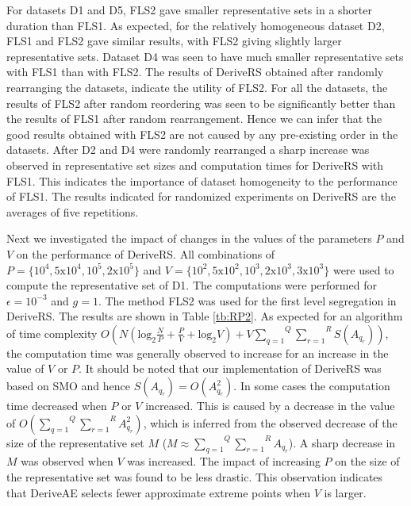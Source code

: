 \documentclass[twoside]{article}
\begin{document}
For datasets D1 and D5, FLS2 gave smaller representative sets in a shorter duration than FLS1. As expected, for the relatively homogeneous dataset D2, FLS1 and FLS2 gave similar results, with FLS2 giving slightly larger representative sets. Dataset D4 was seen to have much smaller representative sets with FLS1 than with FLS2. The results of DeriveRS obtained after randomly rearranging the datasets, indicate the utility of FLS2. For all the datasets, the results of FLS2 after random reordering was seen to be significantly better than the results of FLS1 after random rearrangement. Hence we can infer that the good results obtained with FLS2 are not caused by any pre-existing order in the datasets. After D2 and D4 were randomly rearranged a sharp increase was observed in representative set sizes and computation times for DeriveRS with FLS1. This indicates the importance of dataset homogeneity to the performance of FLS1. The results indicated for randomized experiments on DeriveRS are the averages of five repetitions.

Next we investigated the impact of changes in the values of the parameters $P$ and $V$ on the performance of DeriveRS. All combinations of $P = \{10^4, 5\text{x}10^4,10^5,2\text{x}10^5\}$ and $V = \{10^2,5\text{x}10^2,10^3,2\text{x}10^3,3\text{x}10^3\}$ were used to compute the representative set of D1. The computations were performed for $\epsilon = 10^{-3}$ and $g = 1$. The method FLS2 was used for the first level segregation in DeriveRS. The results are shown in Table \ref{tb:RP2}. As expected for an algorithm of time complexity $O(N (\text{log}_2 \frac{N}{P} + \frac{P}{V} + \text{log}_2 V) + V\overset{Q}{\underset{q = 1}{\sum}} \overset{R}{\underset{r = 1}{\sum}} S(A_{q_r}))$,  the computation time was generally observed to increase for an increase in the value of $V$ or $P$. It should be noted that our implementation of DeriveRS was based on SMO and hence $S(A_{q_r}) = O(A_{q_r} ^2)$. In some cases the computation time decreased when $P$ or $V$ increased. This is caused by a decrease in the value of $O(\overset{Q}{\underset{q = 1}{\sum}} \overset{R}{\underset{r = 1}{\sum}} A_{q_r} ^2)$, which is inferred from the observed decrease of the size of the representative set $M$ ($M \approx \overset{Q}{\underset{q = 1}{\sum}} \overset{R}{\underset{r = 1}{\sum}} A_{q_r}$). A sharp decrease in $M$ was observed when $V$ was increased. The impact of increasing $P$ on the size of the representative set was found to be less drastic. This observation indicates that DeriveAE selects fewer approximate extreme points when $V$ is larger.
\end{document}
